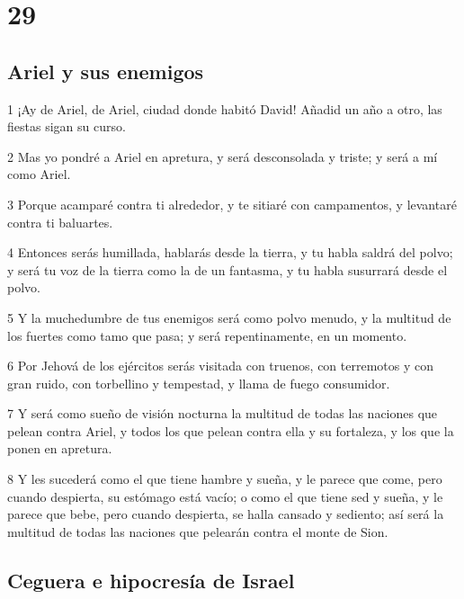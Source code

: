\chapter{29}

\section*{Ariel y sus enemigos}

\par 1 ¡Ay de Ariel, de Ariel, ciudad donde habitó David! Añadid un año a otro, las fiestas sigan su curso.
\par 2 Mas yo pondré a Ariel en apretura, y será desconsolada y triste; y será a mí como Ariel.
\par 3 Porque acamparé contra ti alrededor, y te sitiaré con campamentos, y levantaré contra ti baluartes.
\par 4 Entonces serás humillada, hablarás desde la tierra, y tu habla saldrá del polvo; y será tu voz de la tierra como la de un fantasma, y tu habla susurrará desde el polvo.
\par 5 Y la muchedumbre de tus enemigos será como polvo menudo, y la multitud de los fuertes como tamo que pasa; y será repentinamente, en un momento.
\par 6 Por Jehová de los ejércitos serás visitada con truenos, con terremotos y con gran ruido, con torbellino y tempestad, y llama de fuego consumidor.
\par 7 Y será como sueño de visión nocturna la multitud de todas las naciones que pelean contra Ariel, y todos los que pelean contra ella y su fortaleza, y los que la ponen en apretura.
\par 8 Y les sucederá como el que tiene hambre y sueña, y le parece que come, pero cuando despierta, su estómago está vacío; o como el que tiene sed y sueña, y le parece que bebe, pero cuando despierta, se halla cansado y sediento; así será la multitud de todas las naciones que pelearán contra el monte de Sion.

\section*{Ceguera e hipocresía de Israel}

